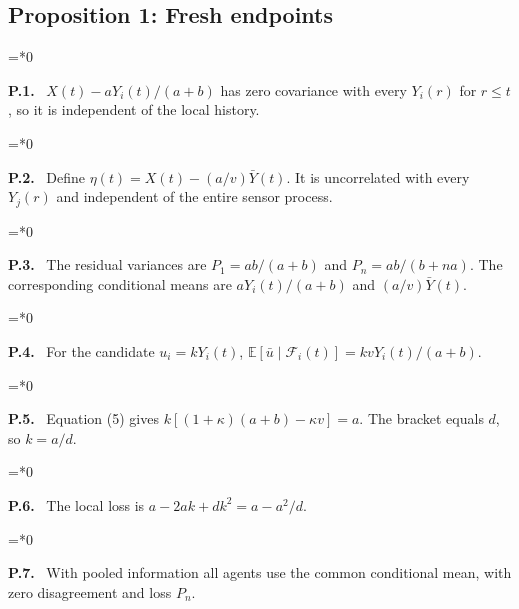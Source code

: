 \documentclass[11pt,letterpaper]{article}
\newcommand{\E}{\mathbb E}
\newenvironment{proofstep}[2]{%
  \begin{list}{}{\leftmargin=\dimexpr 0.17in*#2\relax%
  \setlength{\rightmargin}{0pt}\setlength{\topsep}{5pt}\setlength{\parsep}{2pt}}%
  \item[]\textbf{\textcolor{ink}{#1.}}\ }{\end{list}}
\begin{document}
\subsection{Proposition 1: Fresh endpoints}
\begin{proofstep}{P.1}{0}
$X(t)-aY_i(t)/(a+b)$ has zero covariance with every $Y_i(r)$ for $r\le t$, so it is independent of the local history.
\par\nopagebreak{}
\end{proofstep}
\begin{proofstep}{P.2}{0}
Define $\eta(t)=X(t)-(a/v)\bar Y(t)$. It is uncorrelated with every $Y_j(r)$ and independent of the entire sensor process.
\par\nopagebreak{}
\end{proofstep}
\begin{proofstep}{P.3}{0}
The residual variances are $P_1=ab/(a+b)$ and $P_n=ab/(b+na)$. The corresponding conditional means are $aY_i(t)/(a+b)$ and $(a/v)\bar Y(t)$.
\par\nopagebreak{}
\end{proofstep}
\begin{proofstep}{P.4}{0}
For the candidate $u_i=kY_i(t)$, $\E[\bar u\mid\mathcal F_i(t)]=kvY_i(t)/(a+b)$.
\par\nopagebreak{}
\end{proofstep}
\begin{proofstep}{P.5}{0}
Equation (5) gives $k[(1+\kappa)(a+b)-\kappa v]=a$. The bracket equals $d$, so $k=a/d$.
\par\nopagebreak{}
\end{proofstep}
\begin{proofstep}{P.6}{0}
The local loss is $a-2ak+dk^2=a-a^2/d$.
\par\nopagebreak{}
\end{proofstep}
\begin{proofstep}{P.7}{0}
With pooled information all agents use the common conditional mean, with zero disagreement and loss $P_n$.
\par\nopagebreak{}
\end{proofstep}
\end{document}
